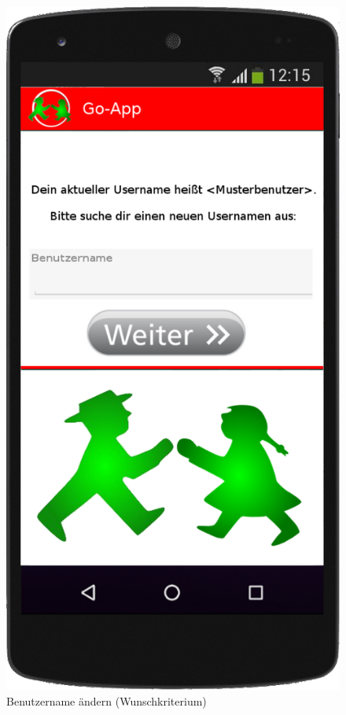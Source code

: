 \begin{figure}
	\includegraphics[scale=0.2]{resources/images/handy/username_aendern.png}
	\caption{Benutzername ändern (Wunschkriterium)}
\end{figure}

